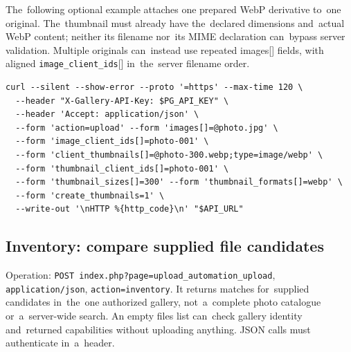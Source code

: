 \documentclass[11pt,a4paper]{article}
\newcommand{\codeword}[1]{\nolinkurl{#1}}
\begin{document}
The~following optional example attaches one prepared WebP derivative to~one original.
The~thumbnail must already have the~declared dimensions and~actual WebP content; neither its
filename nor~its MIME declaration can~bypass server validation. Multiple originals
can~instead use repeated images[] fields, with aligned \codeword{image_client_ids}[]
in~the~server filename order.

\begin{lstlisting}[language={}]
curl --silent --show-error --proto '=https' --max-time 120 \
  --header "X-Gallery-API-Key: $PG_API_KEY" \
  --header 'Accept: application/json' \
  --form 'action=upload' --form 'images[]=@photo.jpg' \
  --form 'image_client_ids[]=photo-001' \
  --form 'client_thumbnails[]=@photo-300.webp;type=image/webp' \
  --form 'thumbnail_client_ids[]=photo-001' \
  --form 'thumbnail_sizes[]=300' --form 'thumbnail_formats[]=webp' \
  --form 'create_thumbnails=1' \
  --write-out '\nHTTP %{http_code}\n' "$API_URL"
\end{lstlisting}

\subsection{\texorpdfstring{Inventory: compare supplied file candidates}{Inventory: compare supplied file candidates}}

\label{api352:inventory}

Operation: \codeword{POST index.php?page=upload_automation_upload},
\codeword{application/json}, \codeword{action=inventory}. It returns matches for~supplied
candidates in~the~one authorized gallery, not~a~complete photo catalogue or~a~server-wide
search. An empty files list can~check gallery identity and~returned capabilities without
uploading anything. JSON calls must authenticate in~a~header.
\end{document}
